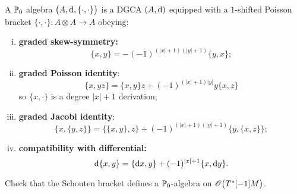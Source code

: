 \begin{definition}
  A $\mathbb{P}_0$ algebra $\bigl( A, \mathrm{d}, \{ \cdot, \cdot \} \bigr)$ is a DGCA $(A, \mathrm{d})$ equipped with a $1$-shifted Poisson bracket $\{ \cdot, \cdot \}: A \otimes A \rightarrow A$ obeying:
  \begin{enumerate}[i)]
    \item \textbf{graded skew-symmetry:}
      \begin{equation*}
        \{x, y\} = - (-1)^{(|x|+1)(|y|+1)} \{y, x\};
      \end{equation*}
    \item \textbf{graded Poisson identity}:
      \begin{equation*}
        \{x, yz \} = \{x, y\} z + (-1)^{(|x|+1)|y|} y \{x, z\}
      \end{equation*}
      so $\{x, \cdot \}$ is a degree $|x|+1$ derivation;
    \item \textbf{graded Jacobi identity}:
      \begin{equation*}
        \{x, \{y, z\} \} = \{ \{x, y\}, z \} + (-1)^{(|x|+1)(|y|+1)} \{y, \{x, z\} \};
      \end{equation*}
    \item \textbf{compatibility with differential:}
      \begin{equation*}
        \mathrm{d} \{x, y\} = \{ \mathrm{d} x, y \} + (-1)^{|x|+1} \{x, \mathrm{d} y \}.
      \end{equation*}
  \end{enumerate}
\end{definition}

\begin{exercise}
  Check that the Schouten bracket defines a $\mathbb{P}_0$-algebra on $\mathscr{O}\bigl(T^*[-1] M \bigr)$.
\end{exercise}
